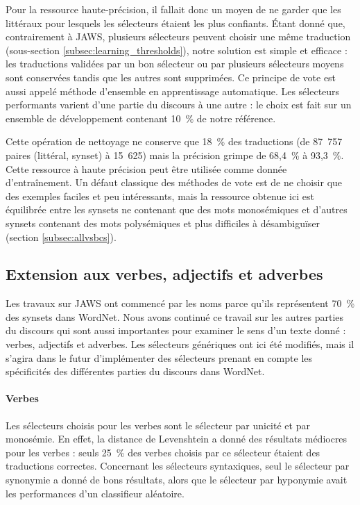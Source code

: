 Pour la ressource haute-précision, il fallait donc un moyen de ne garder que
les littéraux pour lesquels les sélecteurs étaient les plus confiants. Étant
donné que, contrairement à JAWS, plusieurs sélecteurs peuvent choisir une même
traduction (sous-section \ref{subsec:learning_thresholds}), notre solution est
simple et efficace : les traductions validées par un bon sélecteur ou par
plusieurs sélecteurs moyens sont conservées tandis que les autres sont
supprimées. Ce principe de vote est aussi appelé méthode d'ensemble en
apprentissage automatique. Les sélecteurs performants varient d'une partie du
discours à une autre : le choix est fait sur un ensemble de développement
contenant 10~\% de notre référence.

Cette opération de nettoyage ne conserve que 18~\% des traductions (de 87~757
paires (littéral, synset) à 15~625) mais la précision grimpe de 68,4~\% à
93,3~\%. Cette ressource à haute précision peut être utilisée comme donnée
d'entraînement. Un défaut classique des méthodes de vote est de ne choisir que
des exemples faciles et peu intéressants, mais la ressource obtenue ici est
équilibrée entre les synsets ne contenant que des mots monosémiques et d'autres
synsets contenant des mots polysémiques et plus difficiles à désambiguïser
(section \ref{subsec:allvsbcs}).

\subsection{Extension aux verbes, adjectifs et adverbes}
\label{sec:extending_jaws}

Les travaux sur JAWS ont commencé par les noms parce qu'ils représentent 70~\%
des synsets dans WordNet. Nous avons continué ce travail sur les autres parties
du discours qui sont aussi importantes pour examiner le sens d'un texte donné :
verbes, adjectifs et adverbes. Les sélecteurs génériques ont ici été modifiés,
mais il s'agira dans le futur d'implémenter des sélecteurs prenant en compte
les spécificités des différentes parties du discours dans WordNet.

\paragraph{Verbes} Les sélecteurs choisis pour les verbes sont le sélecteur par
unicité et par monosémie. En effet, la distance de Levenshtein a donné des
résultats médiocres pour les verbes : seuls 25~\% des verbes choisis par ce
sélecteur étaient des traductions correctes. Concernant les sélecteurs
syntaxiques, seul le sélecteur par synonymie a donné de bons résultats, alors
que le sélecteur par hyponymie avait les performances d'un classifieur
aléatoire.

